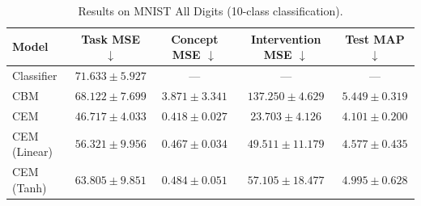 \documentclass{article}
\begin{document}
\begin{table}[h]
\centering
\caption{Results on MNIST All Digits (10-class classification).}
\label{tab:all_digits}
\begin{tabular}{lcccc}
\toprule
\textbf{Model}
  & \textbf{Task MSE} $\downarrow$
  & \textbf{Concept MSE} $\downarrow$
  & \textbf{Intervention MSE} $\downarrow$
  & \textbf{Test MAP} $\downarrow$ \\
\midrule
Classifier
  & $71.633 \pm 5.927$
  & ---
  & ---
  & --- \\
CBM
  & $68.122 \pm 7.699$
  & $3.871 \pm 3.341$
  & $137.250 \pm 4.629$
  & $5.449 \pm 0.319$ \\
CEM
  & $\mathbf{46.717 \pm 4.033}$
  & $\mathbf{0.418 \pm 0.027}$
  & $\mathbf{23.703 \pm 4.126}$
  & $\mathbf{4.101 \pm 0.200}$ \\
CEM (Linear)
  & $56.321 \pm 9.956$
  & $0.467 \pm 0.034$
  & $49.511 \pm 11.179$
  & $4.577 \pm 0.435$ \\
CEM (Tanh)
  & $63.805 \pm 9.851$
  & $0.484 \pm 0.051$
  & $57.105 \pm 18.477$
  & $4.995 \pm 0.628$ \\
\bottomrule
\end{tabular}
\end{table}
\end{document}
